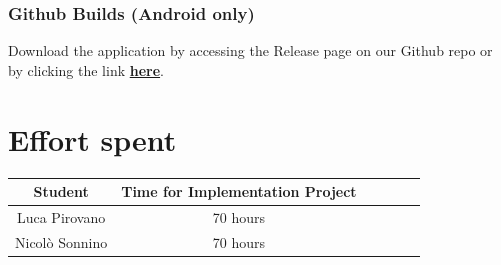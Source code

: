 \documentclass[table, 12pt]{article}
\begin{document}
\subsubsection{Github Builds (Android only)}
Download the application by accessing the Release page on our Github repo or by clicking the link \textbf{\href{https://github.com/PiroX4256/SE2-Piemonti-Pirovano-Sonnino/releases}{here}}. 
\section{Effort spent}
\begin{center}
    \begin{tabular}{ | c || c | c | c | c| c|}
        \hline
        Student        & Time for Implementation Project \\ \hline
        Luca Pirovano  & 70 hours                        \\ \hline
        Nicolò Sonnino & 70 hours                        \\
        \hline
    \end{tabular}
\end{center}
\end{document}
